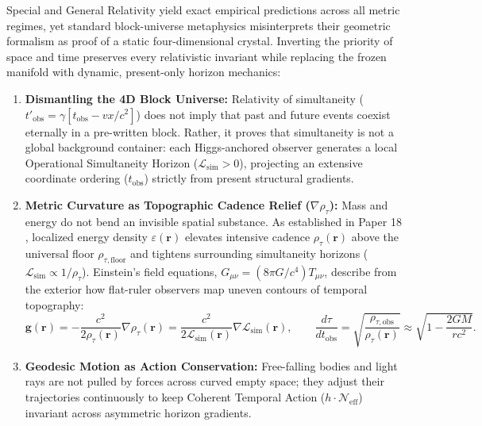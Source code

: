\documentclass[11pt,a4paper]{article}
\begin{document}
Special and General Relativity yield exact empirical predictions across all metric regimes, yet standard block-universe metaphysics misinterprets their geometric formalism as proof of a static four-dimensional crystal. Inverting the priority of space and time preserves every relativistic invariant while replacing the frozen manifold with dynamic, present-only horizon mechanics:

\begin{enumerate}
    \item \textbf{Dismantling the 4D Block Universe:} Relativity of simultaneity ($t'_{\mathrm{obs}} = \gamma [t_{\mathrm{obs}} - vx/c^2]$) does not imply that past and future events coexist eternally in a pre-written block. Rather, it proves that simultaneity is not a global background container: each Higgs-anchored observer generates a local Operational Simultaneity Horizon ($\mathcal{L}_{\mathrm{sim}} > 0$), projecting an extensive coordinate ordering ($t_{\mathrm{obs}}$) strictly from present structural gradients.
    \item \textbf{Metric Curvature as Topographic Cadence Relief ($\nabla \rho_\tau$):} Mass and energy do not bend an invisible spatial substance. As established in Paper 18 \cite{DamasioP18}, localized energy density $\varepsilon(\mathbf{r})$ elevates intensive cadence $\rho_\tau(\mathbf{r})$ above the universal floor $\rho_{\tau,\mathrm{floor}}$ and tightens surrounding simultaneity horizons ($\mathcal{L}_{\mathrm{sim}} \propto 1/\rho_\tau$). Einstein's field equations, $G_{\mu\nu} = (8\pi G / c^4) T_{\mu\nu}$, describe from the exterior how flat-ruler observers map uneven contours of temporal topography:
    \begin{equation}
    \mathbf{g}(\mathbf{r}) = -\frac{c^2}{2\rho_\tau(\mathbf{r})} \nabla \rho_\tau(\mathbf{r}) = \frac{c^2}{2\mathcal{L}_{\mathrm{sim}}(\mathbf{r})} \nabla \mathcal{L}_{\mathrm{sim}}(\mathbf{r}), \qquad \frac{d\tau}{dt_{\mathrm{obs}}} = \sqrt{\frac{\rho_{\tau,\mathrm{obs}}}{\rho_\tau(\mathbf{r})}} \approx \sqrt{1 - \frac{2GM}{rc^2}}.
    \end{equation}
    \item \textbf{Geodesic Motion as Action Conservation:} Free-falling bodies and light rays are not pulled by forces across curved empty space; they adjust their trajectories continuously to keep Coherent Temporal Action ($h \cdot \mathcal{N}_{\mathrm{eff}}$) invariant across asymmetric horizon gradients.
\end{enumerate}
\end{document}
